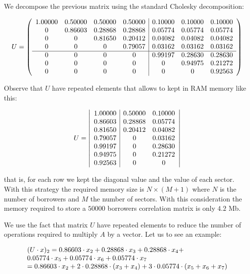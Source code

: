 \documentclass[a4paper,12pt,final]{article}
\begin{document}
We decompose the previous matrix using the standard Cholesky decomposition:

\begin{displaymath}
U = \left(
\begin{array}{cccc|ccc}
 1.00000 & 0.50000 & 0.50000 & 0.50000 & 0.10000 & 0.10000 & 0.10000 \cr
 0       & 0.86603 & 0.28868 & 0.28868 & 0.05774 & 0.05774 & 0.05774 \cr
 0       & 0       & 0.81650 & 0.20412 & 0.04082 & 0.04082 & 0.04082 \cr
 0       & 0       & 0       & 0.79057 & 0.03162 & 0.03162 & 0.03162 \cr
\hline
 0       & 0       & 0       & 0       & 0.99197 & 0.28630 & 0.28630 \cr
 0       & 0       & 0       & 0       & 0       & 0.94975 & 0.21272 \cr
 0       & 0       & 0       & 0       & 0       & 0       & 0.92563
\end{array}
\right)
\end{displaymath}

Observe that $U$ have repeated elements that allows to kept in RAM memory like this:

\begin{displaymath}
U = \left|
\begin{array}{c|cc}
 1.00000 & 0.50000 & 0.10000 \cr
 0.86603 & 0.28868 & 0.05774 \cr
 0.81650 & 0.20412 & 0.04082 \cr
 0.79057 & 0       & 0.03162 \cr
 0.99197 & 0       & 0.28630 \cr
 0.94975 & 0       & 0.21272 \cr
 0.92563 & 0       & 0
\end{array}
\right|
\end{displaymath}

that is, for each row we kept the diagonal value and the value of each sector. 
With this strategy the required memory size is $N \times (M+1)$ where $N$ is
the number of borrowers and $M$ the number of sectors. With this consideration
the memory required to store a $50000$ borrowers correlation matrix is only
$4.2$ Mb.
\newline

We use the fact that matrix $U$ have repeated elements to reduce the number of 
operations required to multiply $A$ by a vector. Let us to see an example:

\begin{displaymath}
\begin{array}{l}
(U \cdot x)_2 =  0.86603 \cdot x_2 + 0.28868 \cdot x_3 + 0.28868 \cdot x_4 + \cr
                 0.05774 \cdot x_5 + 0.05774 \cdot x_6 + 0.05774 \cdot x_7 \cr
              = 0.86603 \cdot x_2 + 2\cdot 0.28868 \cdot (x_3 + x_4) + 3 \cdot 0.05774 \cdot (x_5 + x_6 + x_7)
\end{array}
\end{displaymath}
\end{document}
